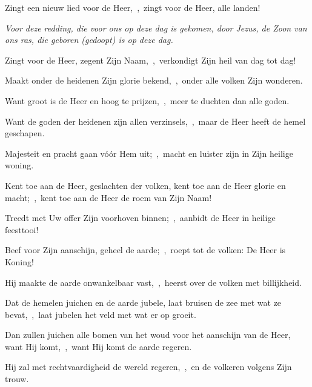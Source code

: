 \documentclass[12pt,twoside,a5paper]{article}
\begin{document}
\begin{halfparskip}

  Zingt een nieuw lied voor de Heer,~\sep\ zingt voor de Heer, alle landen!


   \emph{Voor deze redding, die voor ons op deze dag is gekomen, door Jezus, de Zoon van ons ras, die geboren (gedoopt) is op deze dag.}

  Zingt voor de Heer, zegent Zijn Naam,~\sep\ verkondigt Zijn heil van dag tot dag!

  Maakt onder de heidenen Zijn glorie bekend,~\sep\ onder alle volken Zijn wonderen.

  Want groot is de Heer en hoog te prijzen,~\sep\ meer te duchten dan alle goden.

  Want de goden der heidenen zijn allen verzinsels,~\sep\ maar de Heer heeft de hemel geschapen.

  Majesteit en pracht gaan vóór Hem uit;~\sep\ macht en luister zijn in Zijn heilige woning.
\end{halfparskip}

\begin{halfparskip}

  Kent toe aan de Heer, geslachten der volken, kent toe aan de Heer glorie en macht;~\sep\ kent toe aan de Heer de roem van Zijn Naam!

  Treedt met Uw offer Zijn voorhoven binnen;~\sep\ aanbidt de Heer in heilige feesttooi!

  Beef voor Zijn aanschijn, geheel de aarde;~\sep\ roept tot de volken: De Heer is Koning!

  Hij maakte de aarde onwankelbaar vast,~\sep\ heerst over de volken met billijkheid.


  Dat de hemelen juichen en de aarde jubele, laat bruisen de zee met wat ze bevat,~\sep\ laat jubelen het veld met wat er op groeit.

  Dan zullen juichen alle bomen van het woud voor het aanschijn van de Heer, want Hij komt,~\sep\ want Hij komt de aarde regeren.

  Hij zal met rechtvaardigheid de wereld regeren,~\sep\ en de volkeren volgens Zijn trouw.
\end{halfparskip}
\end{document}
